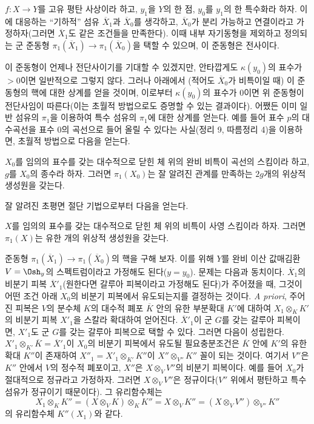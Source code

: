  $f:X\longrightarrow Y$를 고유 평탄 사상이라 하고,
$y_1$을 $Y$의 한 점, $y_0$를 $y_1$의 한 특수화라 하자. 이에 대응하는
``기하적'' 섬유 $\overline X_1$과 $\overline X_0$를 생각하고,
$\overline X_0$가 분리 가능하고 연결이라고 가정하자(그러면
$\overline X_1$도 같은 조건들을 만족한다). 이때 내부 자기동형을 제외하고
정의되는 군 준동형
$\pi_1(\overline X_1)\longrightarrow\pi_1(\overline X_0)$을 택할 수 있으며,
이 준동형은 전사이다.

이 준동형이 언제나 전단사이기를 기대할 수 있겠지만, 안타깝게도
$\kappa(y_0)$의 표수가 $>0$이면 일반적으로 그렇지 않다. 그러나 아래에서
(적어도 $\overline X_0$가 비특이일 때) 이 준동형의 핵에 대한 상계를 얻을
것이며, 이로부터 $\kappa(y_0)$의 표수가 $0$이면 위 준동형이 전단사임이
따른다(이는 초월적 방법으로도 증명할 수 있는 결과이다). 어쨌든 이미
일반 섬유의 $\pi_1$을 이용하여 특수 섬유의 $\pi_1$에 대한 상계를 얻는다.
예를 들어 표수 $p$의 대수곡선을 표수 $0$의 곡선으로 들어 올릴 수 있다는
사실(정리 9, 따름정리 4)을 이용하면, 초월적 방법으로 다음을 얻는다.

 $X_0$를 임의의 표수를 갖는 대수적으로 닫힌 체 위의
완비 비특이 곡선의 스킴이라 하고, $g$를 $X_0$의 종수라 하자. 그러면
$\pi_1(X_0)$는 잘 알려진 관계를 만족하는 $2g$개의 위상적 생성원을 갖는다.

잘 알려진 초평면 절단 기법으로부터 다음을 얻는다.

 $X$를 임의의 표수를 갖는 대수적으로 닫힌 체 위의
비특이 사영 스킴이라 하자. 그러면 $\pi_1(X)$는 유한 개의 위상적 생성원을
갖는다.

준동형 $\pi_1(\overline X_1)\longrightarrow\pi_1(\overline X_0)$의 핵을
구해 보자. 이를 위해 $Y$를 완비 이산 값매김환 $V=\Osh_y$의 스펙트럼이라고
가정해도 된다($y=y_0$). 문제는 다음과 동치이다. $\overline X_1$의 비분기
피복 $\overline X'_1$(원한다면 갈루아 피복이라고 가정해도 된다)가 주어졌을
때, 그것이 어떤 조건 아래 $X_0$의 비분기 피복에서 유도되는지를 결정하는
것이다. \textit{A priori}, 주어진 피복은 $V$의 분수체 $K$의 대수적 폐포
$\overline K$ 안의 유한 부분확대 $K'$에 대하여
$X_1\otimes_K K'$의 비분기 피복 $X'_1$을 스칼라 확대하여 얻어진다.
$\overline X'_1$이 군 $G$를 갖는 갈루아 피복이면, $X'_1$도 군 $G$를 갖는
갈루아 피복으로 택할 수 있다. 그러면 다음이 성립한다.
$X'_1\otimes_{K'}\overline K=\overline X'_1$이 $X_0$의 비분기 피복에서
유도될 필요충분조건은 $\overline K$ 안에 $K'$의 유한 확대 $K''$이 존재하여
$X''_1=X'_1\otimes_{K'}K''$이 $X''\otimes_{V''}K''$ 꼴이 되는 것이다.
여기서 $V''$은 $K''$ 안에서 $V$의 정수적 폐포이고, $X''$은
$X\otimes_VV''$의 비분기 피복이다. 예를 들어 $X_0$가 절대적으로
정규라고 가정하자. 그러면 $X\otimes_VV''$은 정규이다($V''$ 위에서
평탄하고 특수 섬유가 정규이기 때문이다). 그 유리함수체는
\[
  X_1\otimes_KK''
  =(X\otimes_VK)\otimes_KK''
  =X\otimes_VK''
  =(X\otimes_VV'')\otimes_{V''}K''
\]
의 유리함수체 $K''(X_1)$와 같다.

